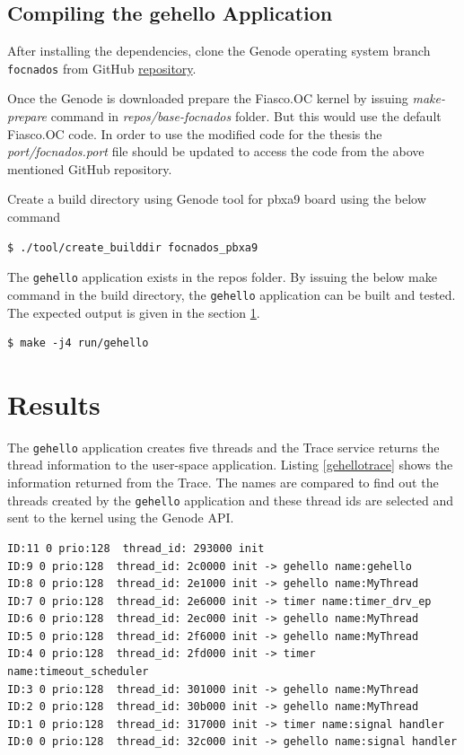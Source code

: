 \subsection{Compiling the gehello Application}
After installing the dependencies, clone the Genode operating system branch \texttt{focnados} from GitHub \href{https://github.com/702nADOS/genode-Synchronization}{repository}.

Once the Genode is downloaded prepare the Fiasco.OC kernel by issuing \textit{make-prepare} command in \textit{repos/base-focnados} folder.  But this would use the default Fiasco.OC code. In order to use the modified code for the thesis the \textit{port/focnados.port} file should be updated to access the code from the above mentioned GitHub repository.

Create a build directory using Genode tool for pbxa9 board using the below command
\begin{verbatim}
$ ./tool/create_builddir focnados_pbxa9
\end{verbatim}

The \texttt{gehello} application exists in the repos folder. By issuing the below make command in the build directory, the \texttt{gehello}  application can be built and tested. The expected output is given in the section \ref{testing:results}.

\begin{verbatim}
$ make -j4 run/gehello
\end{verbatim}

\section{Results}\label{testing:results}
The \texttt{gehello} application creates five threads and the Trace service returns the thread information to the user-space application. Listing \ref{gehellotrace} shows the information returned from the Trace. The names are compared to find out the threads created by the \texttt{gehello} application and these thread ids are selected and sent to the kernel using the Genode API. 

\begin{lstlisting}[caption={The returned information from the Trace service},label={gehellotrace}, style=customcpp]
ID:11 0 prio:128  thread_id: 293000 init 
ID:9 0 prio:128  thread_id: 2c0000 init -> gehello name:gehello
ID:8 0 prio:128  thread_id: 2e1000 init -> gehello name:MyThread
ID:7 0 prio:128  thread_id: 2e6000 init -> timer name:timer_drv_ep
ID:6 0 prio:128  thread_id: 2ec000 init -> gehello name:MyThread
ID:5 0 prio:128  thread_id: 2f6000 init -> gehello name:MyThread
ID:4 0 prio:128  thread_id: 2fd000 init -> timer name:timeout_scheduler
ID:3 0 prio:128  thread_id: 301000 init -> gehello name:MyThread
ID:2 0 prio:128  thread_id: 30b000 init -> gehello name:MyThread
ID:1 0 prio:128  thread_id: 317000 init -> timer name:signal handler
ID:0 0 prio:128  thread_id: 32c000 init -> gehello name:signal handler
\end{lstlisting}

